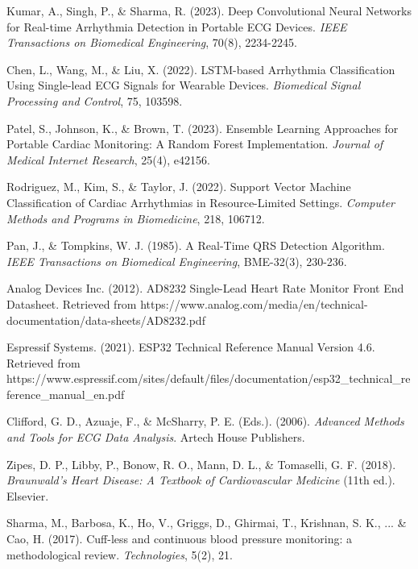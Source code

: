 \documentclass[12pt,a4paper]{article}
\begin{document}
\begin{thebibliography}{99}

Kumar, A., Singh, P., \& Sharma, R. (2023). Deep Convolutional Neural Networks for Real-time Arrhythmia Detection in Portable ECG Devices. \textit{IEEE Transactions on Biomedical Engineering}, 70(8), 2234-2245.

Chen, L., Wang, M., \& Liu, X. (2022). LSTM-based Arrhythmia Classification Using Single-lead ECG Signals for Wearable Devices. \textit{Biomedical Signal Processing and Control}, 75, 103598.

Patel, S., Johnson, K., \& Brown, T. (2023). Ensemble Learning Approaches for Portable Cardiac Monitoring: A Random Forest Implementation. \textit{Journal of Medical Internet Research}, 25(4), e42156.

Rodriguez, M., Kim, S., \& Taylor, J. (2022). Support Vector Machine Classification of Cardiac Arrhythmias in Resource-Limited Settings. \textit{Computer Methods and Programs in Biomedicine}, 218, 106712.

Pan, J., \& Tompkins, W. J. (1985). A Real-Time QRS Detection Algorithm. \textit{IEEE Transactions on Biomedical Engineering}, BME-32(3), 230-236.

Analog Devices Inc. (2012). AD8232 Single-Lead Heart Rate Monitor Front End Datasheet. Retrieved from https://www.analog.com/media/en/technical-documentation/data-sheets/AD8232.pdf

Espressif Systems. (2021). ESP32 Technical Reference Manual Version 4.6. Retrieved from https://www.espressif.com/sites/default/files/documentation/esp32\_technical\_reference\_manual\_en.pdf

Clifford, G. D., Azuaje, F., \& McSharry, P. E. (Eds.). (2006). \textit{Advanced Methods and Tools for ECG Data Analysis}. Artech House Publishers.

Zipes, D. P., Libby, P., Bonow, R. O., Mann, D. L., \& Tomaselli, G. F. (2018). \textit{Braunwald's Heart Disease: A Textbook of Cardiovascular Medicine} (11th ed.). Elsevier.

Sharma, M., Barbosa, K., Ho, V., Griggs, D., Ghirmai, T., Krishnan, S. K., ... \& Cao, H. (2017). Cuff-less and continuous blood pressure monitoring: a methodological review. \textit{Technologies}, 5(2), 21.


\end{thebibliography}
\end{document}
